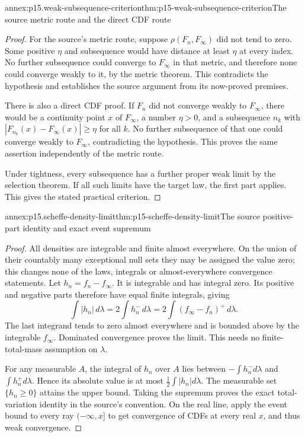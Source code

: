 \begin{annexitem}{annex:p15.weak-subsequence-criterion}{thm:p15-weak-subsequence-criterion}{The source metric route and the direct CDF route}
\begin{proof}
For the source's metric route, suppose
\(\rho(F_n,F_\infty)\) did not tend to zero. Some positive
\(\eta\) and subsequence would have distance at least
\(\eta\) at every index. No further subsequence could
converge to \(F_\infty\) in that metric, and therefore
none could converge weakly to it, by the metric theorem.
This contradicts the hypothesis and establishes the source
argument from its now-proved premises.

There is also a direct CDF proof.
If \(F_n\) did not converge weakly to \(F_\infty\), there
would be a continuity point \(x\) of \(F_\infty\), a number
\(\eta>0\), and a subsequence \(n_k\) with
\(|F_{n_k}(x)-F_\infty(x)|\geq\eta\) for all \(k\).
No further subsequence of that one could converge weakly to
\(F_\infty\), contradicting the hypothesis.
This proves the same assertion independently of the metric route.

Under tightness, every subsequence has a further proper
weak limit by the selection theorem. If all such limits
have the target law, the first part applies. This gives
the stated practical criterion.
\end{proof}
\end{annexitem}

\begin{annexitem}{annex:p15.scheffe-density-limit}{thm:p15-scheffe-density-limit}{The source positive-part identity and exact event supremum}
\begin{proof}
All densities are integrable and finite almost everywhere.
On the union of their countably many exceptional null sets
they may be assigned the value zero; this changes none of the
laws, integrals or almost-everywhere convergence statements.
Let \(h_n=f_n-f_\infty\). It is integrable and has integral
zero. Its positive and negative parts therefore have equal
finite integrals, giving
\[
 \int|h_n|\,d\lambda
      =2\int h_n^-\,d\lambda
      =2\int(f_\infty-f_n)^+\,d\lambda.
\]
The last integrand tends to zero almost everywhere and is
bounded above by the integrable \(f_\infty\).
Dominated convergence proves the limit. This needs no
finite-total-mass assumption on \(\lambda\).

For any measurable \(A\), the integral of \(h_n\) over \(A\)
lies between \(-\int h_n^-d\lambda\) and
\(\int h_n^+d\lambda\). Hence its absolute value is at most
\(\tfrac12\int|h_n|d\lambda\). The measurable set
\(\{h_n\geq0\}\) attains the upper bound.
Taking the supremum proves the exact total-variation identity
in the source's convention. On the real line, apply the
event bound to every ray \((-\infty,x]\) to get convergence
of CDFs at every real \(x\), and thus weak convergence.
\end{proof}
\end{annexitem}


